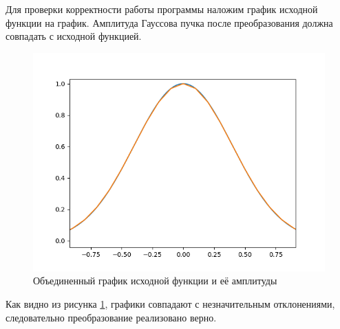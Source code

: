 {    Для проверки корректности работы программы наложим график исходной функции на график. 
    Амплитуда Гауссова пучка после преобразования должна совпадать с исходной функцией.
    
    \begin{figure}[H]
       \centering
            \includegraphics[width=\textwidth,height=\textheight,keepaspectratio]{merged_amplitude_gauss_fft.png}
            \caption{Объединенный график исходной функции и её амплитуды}
            \label{beam_merged_src_amplitude_pic}
    \end{figure}
    Как видно из рисунка \ref{beam_merged_src_amplitude_pic}, графики совпадают с незначительным отклонениями, следовательно преобразование реализовано верно.
    
}

\newpage
